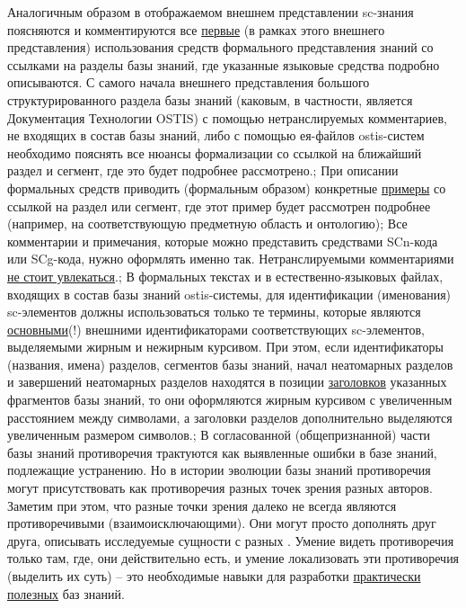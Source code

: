 \begin{SCn}
{Аналогичным образом в отображаемом внешнем представлении sc-знания поясняются и комментируются все \uline{первые} (в рамках этого внешнего представления) использования средств формального представления знаний со ссылками на разделы базы знаний, где указанные языковые средства подробно описываются. С самого начала внешнего представления большого структурированного раздела базы знаний (каковым, в частности, является Документация Технологии OSTIS) с помощью нетранслируемых комментариев, не входящих в состав базы знаний, либо с помощью ея-файлов ostis-систем необходимо пояснять все нюансы формализации со ссылкой на ближайший раздел и сегмент, где это будет подробнее рассмотрено.;
При описании формальных средств приводить (формальным образом) конкретные \uline{примеры} со ссылкой на раздел или сегмент, где этот пример будет рассмотрен подробнее (например, на соответствующую предметную область и онтологию);
Все комментарии и примечания, которые можно представить средствами SCn-кода или SCg-кода, нужно оформлять именно так. Нетранслируемыми комментариями  \uline{не стоит увлекаться}.;
В формальных текстах и в естественно-языковых файлах, входящих в состав базы знаний ostis-системы, для идентификации (именования) sc-элементов должны использоваться только те термины, которые являются \uline{основными}(!) внешними идентификаторами соответствующих sc-элементов, выделяемыми жирным и нежирным курсивом. При этом, если идентификаторы (названия, имена) разделов, сегментов базы знаний, начал неатомарных разделов и завершений неатомарных разделов находятся в позиции \uline{заголовков} указанных фрагментов базы знаний, то они оформляются жирным курсивом с увеличенным расстоянием между символами, а заголовки разделов дополнительно выделяются увеличенным размером символов.;
В согласованной (общепризнанной) части базы знаний противоречия трактуются как выявленные ошибки в базе знаний, подлежащие устранению. Но в истории эволюции
базы знаний противоречия могут присутствовать как противоречия разных точек зрения разных авторов. Заметим при этом, что разные точки зрения далеко не всегда являются противоречивыми (взаимоисключающими). Они могут просто дополнять друг друга, описывать исследуемые сущности с разных . Умение видеть противоречия только там, где, они действительно есть, и умение локализовать эти противоречия (выделить их суть) -- это необходимые навыки для разработки \uline{практически полезных} баз знаний.}
\filemodefalse


\end{SCn}
